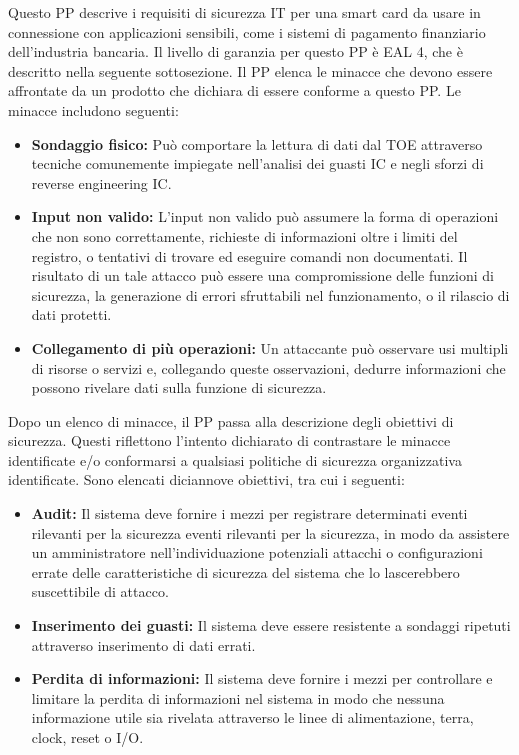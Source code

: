 Questo PP descrive i requisiti di sicurezza IT per una smart card da usare in connessione con applicazioni sensibili, come i sistemi di pagamento finanziario dell'industria bancaria. Il livello di garanzia per questo PP è EAL 4, che è descritto nella seguente sottosezione. Il PP elenca le minacce che devono essere affrontate da un prodotto che dichiara di essere conforme a questo PP. Le minacce includono seguenti:
\begin{itemize}
    \item \textbf{Sondaggio fisico:} Può comportare la lettura di dati dal TOE attraverso tecniche comunemente impiegate nell'analisi dei guasti IC e negli sforzi di reverse engineering IC.
    
    \item \textbf{Input non valido:} L'input non valido può assumere la forma di operazioni che non sono correttamente, richieste di informazioni oltre i limiti del registro, o tentativi di trovare ed eseguire comandi non documentati. Il risultato di un tale attacco può essere una compromissione delle funzioni di sicurezza, la generazione di errori sfruttabili nel funzionamento, o il rilascio di dati protetti.
    
    \item \textbf{Collegamento di più operazioni:} Un attaccante può osservare usi multipli di risorse o servizi e, collegando queste osservazioni, dedurre informazioni che possono rivelare dati sulla funzione di sicurezza.

\end{itemize}

Dopo un elenco di minacce, il PP passa alla descrizione degli obiettivi di sicurezza. Questi riflettono l'intento dichiarato di contrastare le minacce identificate e/o conformarsi a qualsiasi politiche di sicurezza organizzativa identificate. Sono elencati diciannove obiettivi, tra cui i seguenti:

\begin{itemize}
    \item \textbf{Audit:} Il sistema deve fornire i mezzi per registrare determinati eventi rilevanti per la sicurezza eventi rilevanti per la sicurezza, in modo da assistere un amministratore nell'individuazione potenziali attacchi o configurazioni errate delle caratteristiche di sicurezza del sistema che lo lascerebbero suscettibile di attacco.
    
    \item \textbf{Inserimento dei guasti:} Il sistema deve essere resistente a sondaggi ripetuti attraverso inserimento di dati errati.
    
    \item \textbf{Perdita di informazioni:} Il sistema deve fornire i mezzi per controllare e limitare la perdita di informazioni nel sistema in modo che nessuna informazione utile sia rivelata attraverso le linee di alimentazione, terra, clock, reset o I/O.
    
\end{itemize}

